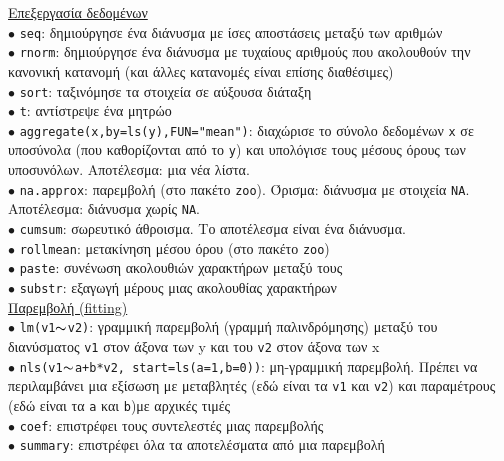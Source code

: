\documentclass[a4paper,10pt,twocolumn]{article}
\begin{document}
\noindent \underline{Επεξεργασία δεδομένων}\vspace{0.2cm}\\
$\bullet$ \texttt{seq}: δημιούργησε ένα διάνυσμα με ίσες αποστάσεις μεταξύ των αριθμών\\
$\bullet$ \texttt{rnorm}: δημιούργησε ένα διάνυσμα με τυχαίους αριθμούς που ακολουθούν την κανονική κατανομή
(και άλλες κατανομές είναι επίσης διαθέσιμες)\\
$\bullet$ \texttt{sort}: ταξινόμησε τα στοιχεία σε αύξουσα διάταξη\\
$\bullet$ \texttt{t}: αντίστρεψε ένα μητρώο\\
$\bullet$ \texttt{aggregate(x,by=ls(y),FUN="mean")}: διαχώρισε το σύνολο δεδομένων \texttt{x} σε υποσύνολα
(που καθορίζονται από το \texttt{y}) και υπολόγισε τους μέσους όρους των υποσυνόλων. Αποτέλεσμα: μια νέα
λίστα.\\
$\bullet$ \texttt{na.approx}: παρεμβολή (στο πακέτο \texttt{zoo}). Όρισμα: διάνυσμα με στοιχεία \texttt{NA}.
Αποτέλεσμα: διάνυσμα χωρίς \texttt{NA}.\\
$\bullet$ \texttt{cumsum}: σωρευτικό άθροισμα. Το αποτέλεσμα είναι ένα διάνυσμα.\\
$\bullet$ \texttt{rollmean}: μετακίνηση μέσου όρου (στο πακέτο \texttt{zoo})\\
$\bullet$ \texttt{paste}: συνένωση ακολουθιών χαρακτήρων μεταξύ τους\\
$\bullet$ \texttt{substr}: εξαγωγή μέρους μιας ακολουθίας χαρακτήρων\\

\noindent \underline{Παρεμβολή (fitting)}\vspace{0.2cm}\\
$\bullet$ \texttt{lm(v1}$\thicksim$\texttt{v2)}: γραμμική παρεμβολή (γραμμή παλινδρόμησης) μεταξύ του
διανύσματος \texttt{v1} στον άξονα των y και του \texttt{v2} στον άξονα των x\\
$\bullet$ \texttt{nls(v1}$\thicksim$\texttt{a+b*v2, start=ls(a=1,b=0))}: μη-γραμμική παρεμβολή. Πρέπει να 
περιλαμβάνει μια εξίσωση με μεταβλητές (εδώ είναι τα \texttt{v1} και \texttt{v2}) και παραμέτρους (εδώ
είναι τα \texttt{a} και \texttt{b})με αρχικές τιμές\\
$\bullet$ \texttt{coef}: επιστρέφει τους συντελεστές μιας παρεμβολής\\
$\bullet$ \texttt{summary}: επιστρέφει όλα τα αποτελέσματα από μια παρεμβολή\\
\end{document}
